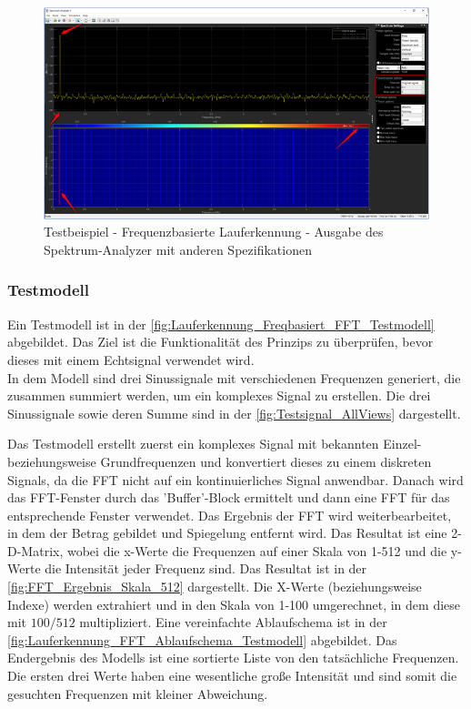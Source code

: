 \begin{figure}[H]
	\centering
	\includegraphics[width=\linewidth]{Bilder/Lauferkennung_Freqbasiert_SpektrumAnalyzerAusgabe_2Einstellungen.png}
	\caption{Testbeispiel - Frequenzbasierte Lauferkennung - Ausgabe des Spektrum-Analyzer mit anderen Spezifikationen}
	\label{fig:Lauferkennung_Freqbasiert_SpektrumAnalyzerAusgabe_2Einstellungen}
\end{figure}

\subsubsection{Testmodell}
Ein Testmodell ist in der \autoref{fig:Lauferkennung_Freqbasiert_FFT_Testmodell} abgebildet. Das Ziel ist die Funktionalität des Prinzips zu überprüfen, bevor dieses mit einem Echtsignal verwendet wird.\\
In dem Modell sind drei Sinussignale mit verschiedenen Frequenzen generiert, die zusammen summiert werden, um ein komplexes Signal zu erstellen.
Die drei Sinussignale sowie deren Summe sind in der \autoref{fig:Testsignal_AllViews} dargestellt.

Das Testmodell erstellt zuerst ein komplexes Signal mit bekannten Einzel- beziehungsweise Grundfrequenzen und konvertiert dieses zu einem diskreten Signals, da die FFT nicht auf ein kontinuierliches Signal anwendbar. Danach wird das FFT-Fenster durch das 'Buffer'-Block ermittelt und dann eine FFT für das entsprechende Fenster verwendet. Das Ergebnis der FFT wird weiterbearbeitet, in dem der Betrag gebildet und Spiegelung entfernt wird. Das Resultat ist eine 2-D-Matrix, wobei die x-Werte die Frequenzen auf einer Skala von 1-512 und die y-Werte die Intensität jeder Frequenz sind. Das Resultat ist in der \autoref{fig:FFT_Ergebnis_Skala_512} dargestellt. Die X-Werte (beziehungsweise Indexe) werden extrahiert und in den Skala von 1-100 umgerechnet, in dem diese mit $100/512$ multipliziert. Eine vereinfachte Ablaufschema ist in der \autoref{fig:Lauferkennung_FFT_Ablaufschema_Testmodell} abgebildet.
Das Endergebnis des Modells ist eine sortierte Liste von den tatsächliche Frequenzen. Die ersten drei Werte haben eine wesentliche große Intensität und sind somit die gesuchten Frequenzen mit kleiner Abweichung.

